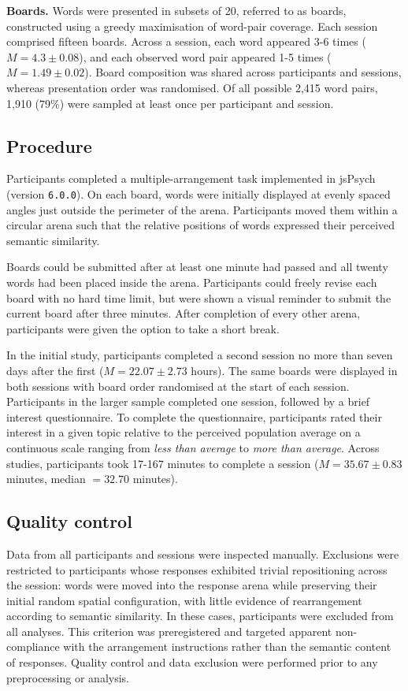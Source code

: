 \documentclass[pdflatex,sn-mathphys]{sn-jnl}
\begin{document}
\textbf{Boards.} Words were presented in subsets of 20, referred to as boards, constructed using a greedy maximisation of word-pair coverage. Each session comprised fifteen boards. Across a session, each word appeared 3-6 times ($M = 4.3\pm0.08$), and each observed word pair appeared 1-5 times ($M = 1.49\pm0.02$). Board composition was shared across participants and sessions, whereas presentation order was randomised. Of all possible 2,415 word pairs, 1,910 (79\%) were sampled at least once per participant and session.

\subsection{Procedure}\label{procedure}
Participants completed a multiple-arrangement task implemented in jsPsych\cite{jsPsych2023} (version \texttt{6.0.0}). On each board, words were initially displayed at evenly spaced angles just outside the perimeter of the arena. Participants moved them within a circular arena such that the relative positions of words expressed their perceived semantic similarity. 

Boards could be submitted after at least one minute had passed and all twenty words had been placed inside the arena. Participants could freely revise each board with no hard time limit, but were shown a visual reminder to submit the current board after three minutes. After completion of every other arena, participants were given the option to take a short break.

In the initial study, participants completed a second session no more than seven days after the first ($M = 22.07\pm2.73$ hours). The same boards were displayed in both sessions with board order randomised at the start of each session. Participants in the larger sample completed one session, followed by a brief interest questionnaire. To complete the questionnaire, participants rated their interest in a given topic relative to the perceived population average on a continuous scale ranging from \textit{less than average} to \textit{more than average}. Across studies, participants took 17-167 minutes to complete a session ($M = 35.67\pm0.83$ minutes, median $= 32.70$ minutes).

\subsection{Quality control}\label{quality}
Data from all participants and sessions were inspected manually. Exclusions were restricted to participants whose responses exhibited trivial repositioning across the session: words were moved into the response arena while preserving their initial random spatial configuration, with little evidence of rearrangement according to semantic similarity. In these cases, participants were excluded from all analyses. This criterion was preregistered\cite{Schneider2026b,Schneider2026c} and targeted apparent non-compliance with the arrangement instructions rather than the semantic content of responses. Quality control and data exclusion were performed prior to any preprocessing or analysis.
\end{document}
